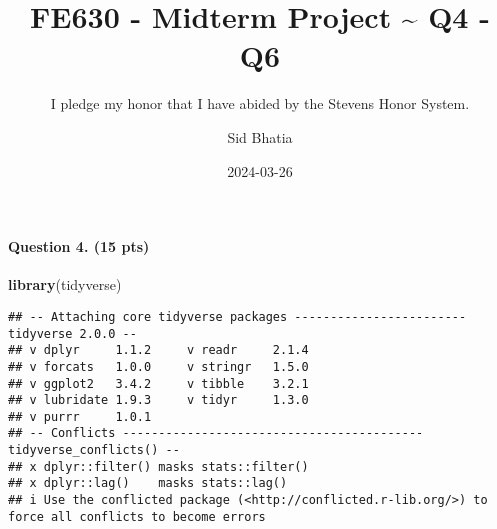 \documentclass[
]{article}
\title{FE630 - Midterm Project \textasciitilde{} Q4 - Q6}
\subtitle{I pledge my honor that I have abided by the Stevens Honor
System.}
\author{Sid Bhatia}
\date{2024-03-26}
\newenvironment{Shaded}{\begin{snugshade}}{\end{snugshade}}
\newcommand{\FunctionTok}[1]{\textcolor[rgb]{0.13,0.29,0.53}{\textbf{#1}}}
\newcommand{\NormalTok}[1]{#1}
\begin{document}
\maketitle

\paragraph{Question 4. (15 pts)}\label{question-4.-15-pts}

\begin{Shaded}
\begin{Highlighting}[]
\FunctionTok{library}\NormalTok{(tidyverse)}
\end{Highlighting}
\end{Shaded}

\begin{verbatim}
## -- Attaching core tidyverse packages ------------------------ tidyverse 2.0.0 --
## v dplyr     1.1.2     v readr     2.1.4
## v forcats   1.0.0     v stringr   1.5.0
## v ggplot2   3.4.2     v tibble    3.2.1
## v lubridate 1.9.3     v tidyr     1.3.0
## v purrr     1.0.1     
## -- Conflicts ------------------------------------------ tidyverse_conflicts() --
## x dplyr::filter() masks stats::filter()
## x dplyr::lag()    masks stats::lag()
## i Use the conflicted package (<http://conflicted.r-lib.org/>) to force all conflicts to become errors
\end{verbatim}
\end{document}
